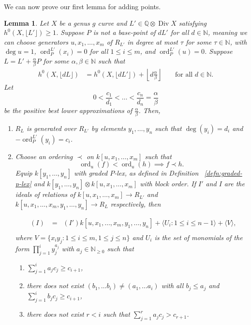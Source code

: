 \documentclass{amsart}
\makeatletter
\theoremstyle{plain}
\newtheorem{lem}[thm]{Lemma}
\theoremstyle{definition}
\theoremstyle{remark}
\numberwithin{equation}{section}
\newcommand\BN{{\mathbb N}}
\newcommand\BQ{{\mathbb Q}}
\DeclareMathOperator{\ord}{ord}
\DeclareMathOperator\di{Div}
\newcommand{\halfcan}{L}
\DeclareMathOperator{\initial}{in_\prec}
\newcommand{\customlabel}[2]{%
   \protected@write \@auxout {}{\string \newlabel {#1}{{#2}{\thepage}{#2}{#1}{}} }%
   \hypertarget{#1}{#2}
}
\makeatother
\begin{document}
We can now prove our first lemma for adding points.

\begin{lem}
\label{lem:sat-1}
Let $X$ be a genus $g$ curve and $\halfcan' \in \BQ \otimes \di X$
satisfying $h^0(X, \lfloor{\halfcan'}\rfloor)\ge 1$. Suppose $P$ is not a base-point of $d\halfcan'$ for all $d \in \BN$, meaning we can choose generators $u, x_1, \ldots, x_m$ of $R_{\halfcan'}$ in degree at most $\tau$ for some $\tau\in \BN$, with $\deg u = 1$, $\ord_P^{\halfcan'}(x_i)=0$ for all $1 \leq i \leq m$, and $\ord_P^{\halfcan'}(u) = 0$.  Suppose $\halfcan = \halfcan' + \frac{\alpha}{\beta} P$
for some $\alpha, \beta \in \BN$ such that
\begin{align}
\label{eqn:deg1-sat-ind}
	h^0(X, \lfloor{d\halfcan}\rfloor) &= h^0(X, \lfloor d\halfcan'
	\rfloor) + \left\lfloor d\frac{\alpha} {\beta} \right \rfloor &&\text{ for all } d \in \mathbb{
	N}.
\end{align}
Let
\[
	0 < \frac{c_1}{d_1} < \ldots < \frac{c_n}{d_n} = \frac{\alpha}{\beta}
\]
be the positive best lower approximations of $\frac{\alpha}{\beta}$.
Then,

\begin{enumerate}
\item[(a)] $R_{\halfcan}$ is generated over $R_{\halfcan'}$ by 
	elements $y_1, \ldots, y_n$ such that $\deg(y_i) = d_i$ and $-\ord_P
	^{L'}(y_i) = c_i$.

\item[(b)] Choose an ordering $\prec$ on $k[u, x_1, \ldots, x_m]$ such that
	\[
		\ord_u(f) < \ord_u(h) \implies f\prec h.
	\]
	Equip $k[y_1, \ldots, y_n]$ with graded $P$-lex, as defined in
	Definition ~\ref{defn:graded-p-lex} and $k[y_1, \ldots, y_n] \otimes k[u, x_1, \ldots, x_m]$ with block order.
	If $I'$ and $I$ are the ideals of relations of $k[u, x_1, \ldots, x_m]
	\to R_{\halfcan'}$ and $k[u, x_1, \ldots, x_m, y_1, \ldots, y_n]
	\to R_{\halfcan}$ respectively, then

	\begin{align*}
		\initial(I) &= \initial(I') k[u, x_1, \ldots, x_m, y_1, \ldots, y_n] 
											 + \langle U_i: 1 \le i \le n-1 \rangle
											 + \langle V \rangle, \\
	\end{align*}
	where $V = \{x_i y_j: 1 \le i \le m, 1 \le j \le n\}$ and $U_i$ is
	the set of monomials of the form $\prod_{j = 1}^{i} y_j^{a_j}$ with
	$a_j \in \BN_{\ge 0}$ such that
	\begin{enumerate}
		\item[\customlabel{custom:sat-1-*}{(*)}] $\sum_{j = 1}^i a_j c_j \ge c_{i+1}$, \\
		\item[\customlabel{custom:sat-1-**}{(**)}] there does not exist $(b_1, \ldots b_i) \ne (a_1,
			\ldots a_i)$ with all $b_j \le a_j$ and $\sum_{j = 1}^i b_j
			c_j \ge	c_{i + 1}$, \\
		\item[\customlabel{custom:sat-1-***}{(***)}] there does not
			exist $r<i$ such that $\sum_{j=1}^r a_j c_j> c_{r + 1}$.
	\end{enumerate}


\end{enumerate}
\end{lem}
\end{document}
